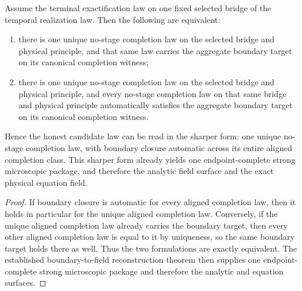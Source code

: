 \begin{theorem}
\label{thm:canonical-completion-law-boundary-fill-target}
Assume the terminal exactification law on one fixed selected bridge of the
temporal realization law. Then the following are equivalent:
\begin{enumerate}
\item there is one unique no-stage completion law on the selected bridge and
physical principle, and that same law carries the aggregate boundary
target on its canonical completion witness;
\item there is one unique no-stage completion law on the selected bridge and
physical principle, and every no-stage completion law on that same bridge and
physical principle automatically satisfies the aggregate boundary
target on its canonical completion witness.
\end{enumerate}
Hence the honest candidate law can be read in the sharper form:
one unique no-stage completion law, with boundary closure automatic across its
entire aligned completion class. This sharper form already yields one
endpoint-complete strong microscopic package, and therefore the analytic
field surface and the exact physical equation field.
\end{theorem}

\begin{proof}
If boundary closure is automatic for every aligned completion law, then it
holds in particular for the unique aligned completion law. Conversely, if the
unique aligned completion law already carries the boundary target, then every
other aligned completion law is equal to it by uniqueness, so the same
boundary target holds there as well. Thus the two formulations are exactly
equivalent. The established boundary-to-field reconstruction theorem then
supplies one endpoint-complete strong microscopic package and therefore the
analytic and equation surfaces.
\end{proof}

